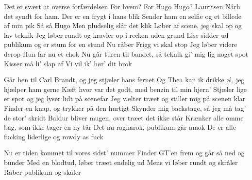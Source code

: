 \documentclass[a4paper,11pt]{article}
\begin{document}
\begin{song}
Det er svært at overse forfærdelsen
For hvem?
For Hugo
Hugo?
Lauritsen
Nårh det syndt for ham. Der er en frygt i hans blik
Sender ham en selfie og et billede af min pik
Så så Hugo
Men pludselig slår det klik
Løber af scene, jeg skal op og lav teknik
Jeg løber rundt og kravler op i recken uden grund
Lise sidder ud publikum og er stum for en stund
Nu råber Frigg vi skal stop 
Jeg løber videre derop 
Hun får nu et chok
Nu går turen til bandet, så teknik gi' mig lig noget spot
Kisser må li' slap af 
Vi vil ik' hør' dit brok

Går hen til Carl Brandt, og jeg stjæler hans fernet
Og Thea kan ik drikke øl, jeg hjælper ham gerne
Kæft hvor var det godt, med benzin til min hjern'
Stjæler lige et spot og jeg lyser lidt på scenefar
Jeg vælter træet og stiller mig på scenen klar
Finder en knap, og trykker på den hurtigt
Skynder mig backstage, så jeg må tag' de stor' skridt
Baldur bliver mugen, over træet det ikke står
Krænker alle omme bag, som ikke tager en ny tår
Det nu ragnarok, publikum går amok
De er alle fucking liderlige og rowdy as fuck

Nu er tiden kommet til vores sidst' nummer
Finder GT'en frem og går så ned og bunder
Med en blodtud, løber træet endelig ud
Mens vi løber rundt og skråler
Råber publikum og skåler
\end{song}
\end{document}
